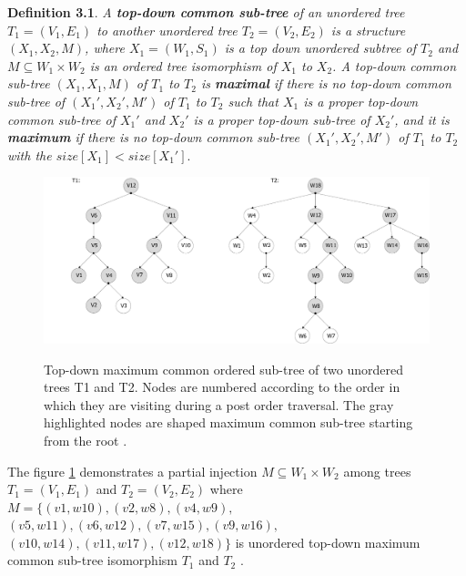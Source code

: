 \documentclass{report}
\begin{document}
\textbf{Definition 3.1}. \emph{
A \textbf{top-down common sub-tree} of an unordered tree $ T_{1} = ( V_{1}, E_{1})$ to another unordered tree $ T_{2} = ( V_{2}, E_{2})$ is a structure 
$ (X_{1}, X_{2}, M)$, where $ X_{1} = (W_{1}, S_{1})$ is a top down unordered subtree of $ T_{2}$ and $M \subseteq W_{1} \times  W_{2}$ is an ordered tree isomorphism of $ X_{1}$ to $ X_{2}$. A top-down common sub-tree $ (X_{1}, X_{1}, M)$ of $ T_{1}$ to $ T_{2}$ is \textbf{maximal} if there is no top-down common sub-tree of $ (X_{1}', X_{2}', M')$ of $ T_{1}$ to $ T_{2}$ such that $ X_{1}$  is a proper top-down common sub-tree of $ X_{1}'$ and $ X_{2}'$ is a proper top-down sub-tree of $ X_{2}'$, and it is \textbf{maximum} if there is no top-down common sub-tree $ (X_{1}', X_{2}', M')$  of $ T_{1}$ to $ T_{2}$ with the $size[X_{1}] < size[X_{1}']$}\cite{valiente}.


\begin{figure}[hb]
  \centering
  \includegraphics[scale=0.45]{Figures/algorithms/TD/top-down-max-common-example-adjusted.pdf}\\[0.1cm]
  \caption[Top-down maximum common ordered sub-tree of two unordered trees]{Top-down maximum common ordered sub-tree of two unordered trees T1 and T2. Nodes are numbered according to the order in which they are visiting during a post order traversal. The gray highlighted nodes are shaped maximum common sub-tree starting from the root \cite{valiente}.}
  \label{fig:top-down-max-common-example-adjusted}
\end{figure}

The figure \ref{fig:top-down-max-common-example-adjusted} demonstrates a partial injection $M \subseteq W_{1} \times  W_{2}$ among trees $ T_{1} = ( V_{1}, E_{1})$ and  $ T_{2} = ( V_{2}, E_{2})$ where $M  = \{ (v1,w10),  (v2,w8), (v4,w9), $ \\
$(v5,w11),  (v6,w12),  (v7,w15),  (v9,w16), $  $ (v10,w14),  (v11,w17),  (v12,w18)\}$ is unordered top-down maximum common sub-tree isomorphism $ T_{1}$ and $ T_{2 }$ \cite{valiente}.
\end{document}
